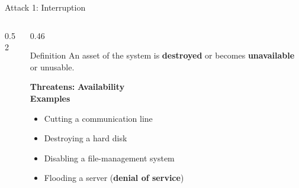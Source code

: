\documentclass[aspectratio=169,11pt,xcolor={table}]{beamer}
\begin{document}
\begin{frame}{Attack 1: Interruption}
  \begin{columns}[c]
    \begin{column}{0.52\textwidth}
      \centering
    \end{column}
    \begin{column}{0.46\textwidth}
      \begin{alertblock}{Definition}
        An asset of the system is \textbf{destroyed} or becomes \textbf{unavailable} or unusable.
      \end{alertblock}
      \vspace{1mm}
      \textbf{Threatens:} \textcolor{grape}{\textbf{Availability}}\\[3pt]
      \textbf{Examples}
      \begin{itemize}\small
        \item Cutting a communication line
        \item Destroying a hard disk
        \item Disabling a file-management system
        \item Flooding a server (\textbf{denial of service})
      \end{itemize}
    \end{column}
  \end{columns}
\end{frame}
\end{document}
